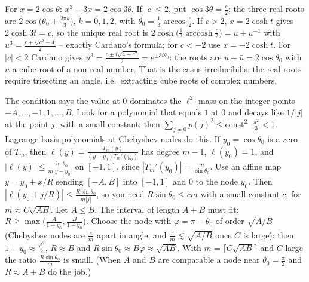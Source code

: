 \documentclass[11pt,a4paper]{article}
\begin{document}
 For $x=2\cos\theta$: $x^3-3x=2\cos3\theta$. If $|c|\le2$, put $\cos3\theta=\frac c2$; the three real roots are $2\cos\bigl(\theta_0+\frac{2\pi k}3\bigr)$, $k=0,1,2$, with $\theta_0=\frac13\arccos\frac c2$.
 If $c>2$, $x=2\cosh t$ gives $2\cosh3t=c$, so the unique real root is $2\cosh\bigl(\frac13\operatorname{arccosh}\frac c2\bigr)=u+u^{-1}$ with $u^3=\frac{c+\sqrt{c^2-4}}2$ -- exactly Cardano's formula; for $c<-2$ use $x=-2\cosh t$.
 For $|c|<2$ Cardano gives $u^3=\frac{c\pm i\sqrt{4-c^2}}2=e^{\pm3i\theta_0}$: the roots are $u+\bar u=2\cos\theta_0$ with $u$ a cube root of a non-real number. That is the casus irreducibilis: the real roots require trisecting an angle, i.e.\ extracting cube roots of complex numbers.

 The condition says the value at $0$ dominates the $\ell^2$-mass on the integer points $-A,\dots,-1,1,\dots,B$. Look for a polynomial that equals $1$ at $0$ and decays like $1/|j|$ at the point $j$, with a small constant: then $\sum_{j\ne0}p(j)^2\le\text{const}^2\cdot\frac{\pi^2}3<1$.
 Lagrange basis polynomials at Chebyshev nodes do this. If $y_0=\cos\theta_0$ is a zero of $T_m$, then $\ell(y)=\frac{T_m(y)}{(y-y_0)T_m'(y_0)}$ has degree $m-1$, $\ell(y_0)=1$, and $|\ell(y)|\le\frac{\sin\theta_0}{m|y-y_0|}$ on $[-1,1]$, since $|T_m'(y_0)|=\frac m{\sin\theta_0}$.
 Use an affine map $y=y_0+x/R$ sending $[-A,B]$ into $[-1,1]$ and $0$ to the node $y_0$. Then $|\ell(y_0+j/R)|\le\frac{R\sin\theta_0}{m|j|}$, so you need $R\sin\theta_0\le cm$ with a small constant $c$, for $m\approx C\sqrt{AB}$.
 Let $A\le B$. The interval of length $A+B$ must fit: $R\ge\max\bigl(\frac A{1+y_0},\frac B{1-y_0}\bigr)$. Choose the node with $\varphi=\pi-\theta_0$ of order $\sqrt{A/B}$ (Chebyshev nodes are $\frac\pi m$ apart in angle, and $\frac\pi m\lesssim\sqrt{A/B}$ once $C$ is large): then $1+y_0\approx\frac{\varphi^2}2$, $R\approx B$ and $R\sin\theta_0\approx B\varphi\approx\sqrt{AB}$. With $m=\lceil C\sqrt{AB}\rceil$ and $C$ large the ratio $\frac{R\sin\theta_0}m$ is small. (When $A$ and $B$ are comparable a node near $\theta_0=\frac\pi2$ and $R\approx A+B$ do the job.)
\end{document}
